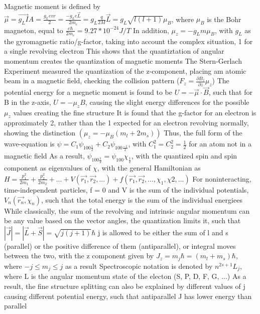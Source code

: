 \documentclass[11 pt, twoside]{article}
\newenvironment{outline*}
{
	\begin{outline}[enumerate]
	}
	{\end{outline}
}
\begin{document}
\begin{outline*}
	\2 Magnetic moment is defined by $\vec{\mu} = \vec{g_LI}A = \frac{g_Levr}{2} = \frac{-g_Le\vec{L}}{2m_e} = g_L\frac{q}{2M}\vec{L} = g_L\sqrt{l(l + 1)}\mu_B$, where $\mu_B$ is the Bohr magneton, equal to $\frac{e\hbar}{2m_e} = 9.27 * 10^{-24} J/T$
		\3 In addition, $\mu_z = -g_Lm\mu_B$, with $g_L$ as the gyromagnetic ratio/g-factor, taking into account the complex situation, 1 for a single revolving electron
		\3 This shows that the quantiztation of angular momentum creates the quantization of magnetic moments
		\3 The Stern-Gerlach Experiment measured the quantization of the z-component, placing am atomic beam in a magnetic field, checking the collision pattern ($F_z = \frac{\partial B_z}{\partial z}\mu_z$)
	\2 The potential energy for a megnetic moment is found to be $U = -\vec{\mu} \cdot \vec{B}$, such that for B in the z-axis, $U = -\mu_zB$, causing the slight energy differences for the possible $\mu_z$ values creating the fine structure
	\2 It is found that the g-factor for an electron is approximately 2, rather than the 1 expected for an electron revolving normally, showing the distinction $(\mu_z = -\mu_B(m_l + 2m_s))$
	\2 Thus, the full form of the wave-equation is $\psi = C_1\psi_{100\frac{1}{2}} + C_2\psi_{100\frac{-1}{2}}$, with $C_1^2 = C_2^2 = \frac{1}{2}$ for an atom not in a magnetic field
		\3 As a result, $\psi_{100\frac{1}{2}} = \psi_{100}\chi_{\frac{1}{2}}$, with the quantized spin and spin component as eigenvalues of $\chi$, with the general Hamiltonian as $H = \frac{p_1^2}{2m_1} + \frac{p_2^2}{2m_2} + ... + V(\vec{r_1}, \vec{r_2}, ...) + f(\vec{r_1}, \vec{r_2}, ..., \chi_{1}, \chi{2}, ...)$
		\3 For noninteracting, time-independent particles, f = 0 and V is the sum of the individual potentials, $V_n(\vec{r_n}, \chi_n)$, such that the total energy is the sum of the individual energiees
\1 While classically, the sum of the revolving and intrinsic angular momentum can be any value based on the vector angles, the quantization limits it, such that $|\vec{J}| = |\vec{L} + \vec{S}| = \sqrt{j(j + 1)}\hbar$
	\2 j is allowed to be either the sum of l and s (parallel) or the positive difference of them (antiparallel), or integral moves between the two, with the z component given by $J_z = m_j\hbar = (m_l + m_s)\hbar$, where $-j \leq m_j \leq j$ as a result
		\3 Spectroscopic notation is denoted by $n^{2s + 1}L_j$, where L is the angular momentum state of the electon (S, P, D, F, G, ...)
		\3 As a result, the fine structure splitting can also be explained by different values of j causing different potential energy, such that antiparallel J has lower energy than parallel

\end{outline*}
\end{document}
